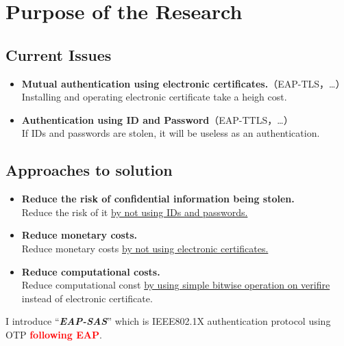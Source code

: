 \section{Purpose of the Research}
\toc
\subsection{Current Issues}
\begin{frame}{\ft}
    \begin{alertblock}{}
        \begin{itemize}
            \setlength{\itemsep}{1em}
            \item \textbf{Mutual authentication using electronic certificates.}（EAP-TLS，\dots）\\\vspace{.5em}
                  Installing and operating electronic certificate take a heigh cost.
            \item \textbf{Authentication using ID and Password}（EAP-TTLS，\dots）\\\vspace{.5em}
                  If IDs and passwords are stolen, it will be useless as an authentication.
        \end{itemize}
    \end{alertblock}
\end{frame}
\subsection{Approaches to solution}
\begin{frame}{\ft}
    \begin{exampleblock}{}
        \begin{itemize}
            \setlength{\itemsep}{1em}
            \item \textbf{Reduce the risk of confidential information being stolen.}\\
                  Reduce the risk of it \underline{by not using IDs and passwords.}
            \item \textbf{Reduce monetary costs.}\\
                  Reduce monetary costs \underline{by not using electronic certificates.}
            \item \textbf{Reduce computational costs.}\\
                  Reduce computational const \underline{by using simple bitwise operation on verifire} instead of electronic certificate.
        \end{itemize}
    \end{exampleblock}
    I introduce ``\textit{\bfseries EAP-SAS}'' which is IEEE802.1X authentication protocol using OTP \textcolor{red}{\bfseries following EAP}.
\end{frame}